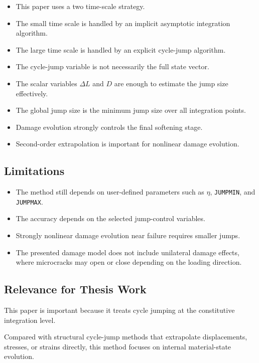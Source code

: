 ﻿\documentclass[11pt,a4paper]{article}
\begin{document}
\begin{itemize}[leftmargin=*]
    \item This paper uses a two time-scale strategy.
    \item The small time scale is handled by an implicit asymptotic integration algorithm.
    \item The large time scale is handled by an explicit cycle-jump algorithm.
    \item The cycle-jump variable is not necessarily the full state vector.
    \item The scalar variables $\Delta L$ and $D$ are enough to estimate the jump size effectively.
    \item The global jump size is the minimum jump size over all integration points.
    \item Damage evolution strongly controls the final softening stage.
    \item Second-order extrapolation is important for nonlinear damage evolution.
\end{itemize}

\subsection{Limitations}

\begin{itemize}[leftmargin=*]
    \item The method still depends on user-defined parameters such as $\eta$, \texttt{JUMPMIN}, and \texttt{JUMPMAX}.
    \item The accuracy depends on the selected jump-control variables.
    \item Strongly nonlinear damage evolution near failure requires smaller jumps.
    \item The presented damage model does not include unilateral damage effects, where microcracks may open or close depending on the loading direction.
\end{itemize}

\subsection{Relevance for Thesis Work}

This paper is important because it treats cycle jumping at the constitutive integration level.

Compared with structural cycle-jump methods that extrapolate displacements, stresses, or strains directly, this method focuses on internal material-state evolution.
\end{document}
